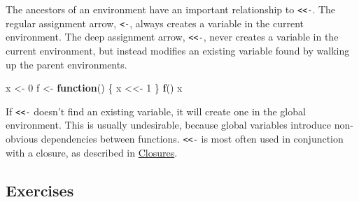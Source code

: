 \documentclass[]{book}
\newenvironment{Shaded}{\begin{snugshade}}{\end{snugshade}}
\newcommand{\KeywordTok}[1]{\textcolor[rgb]{0.13,0.29,0.53}{\textbf{#1}}}
\newcommand{\DecValTok}[1]{\textcolor[rgb]{0.00,0.00,0.81}{#1}}
\newcommand{\StringTok}[1]{\textcolor[rgb]{0.31,0.60,0.02}{#1}}
\newcommand{\ControlFlowTok}[1]{\textcolor[rgb]{0.13,0.29,0.53}{\textbf{#1}}}
\newcommand{\NormalTok}[1]{#1}
\theoremstyle{definition}
\theoremstyle{definition}
\theoremstyle{definition}
\theoremstyle{remark}
\begin{document}
The ancestors of an environment have an important relationship to
\texttt{\textless{}\textless{}-}. The regular assignment arrow,
\texttt{\textless{}-}, always creates a variable in the current
environment. The deep assignment arrow,
\texttt{\textless{}\textless{}-}, never creates a variable in the
current environment, but instead modifies an existing variable found by
walking up the parent environments.

\begin{Shaded}
\begin{Highlighting}[]
\NormalTok{x <-}\StringTok{ }\DecValTok{0}
\NormalTok{f <-}\StringTok{ }\ControlFlowTok{function}\NormalTok{() \{}
\NormalTok{  x <<-}\StringTok{ }\DecValTok{1}
\NormalTok{\}}
\KeywordTok{f}\NormalTok{()}
\NormalTok{x}
\end{Highlighting}
\end{Shaded}

If \texttt{\textless{}\textless{}-} doesn't find an existing variable,
it will create one in the global environment. This is usually
undesirable, because global variables introduce non-obvious dependencies
between functions. \texttt{\textless{}\textless{}-} is most often used
in conjunction with a closure, as described in
\protect\hyperlink{closures}{Closures}.

\subsection{Exercises}\label{exercises-10}
\end{document}
